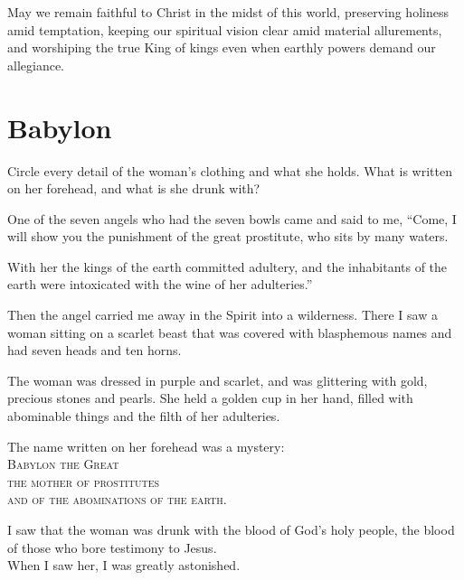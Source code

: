 May we remain faithful to Christ in the midst of this world, preserving holiness amid temptation, keeping our spiritual vision clear amid material allurements, and worshiping the true King of kings even when earthly powers demand our allegiance.

\section{Babylon}

\begin{ScriptureBox2}{Circle every detail of the woman's clothing and what she holds. What is written on her forehead, and what is she drunk with?}

\item[17:1] One of the seven angels who had the seven bowls came and said to me, ``Come, I will show you the punishment of the great prostitute, who sits by many waters.

\item[17:2] With her the kings of the earth committed adultery, and the inhabitants of the earth were intoxicated with the wine of her adulteries.''

\item[17:3] Then the angel carried me away in the Spirit into a wilderness. There I saw a woman sitting on a scarlet beast that was covered with blasphemous names and had seven heads and ten horns.

\item[17:4] The woman was dressed in purple and scarlet, and was glittering with gold, precious stones and pearls. She held a golden cup in her hand, filled with abominable things and the filth of her adulteries.

\item[17:5] The name written on her forehead was a mystery:\\
\hspace*{1em}\textsc{Babylon the Great}\\
\hspace*{1em}\textsc{the mother of prostitutes}\\
\hspace*{1em}\textsc{and of the abominations of the earth.}

\item[17:6] I saw that the woman was drunk with the blood of God's holy people, the blood of those who bore testimony to Jesus.\\
When I saw her, I was greatly astonished.


\end{ScriptureBox2}
